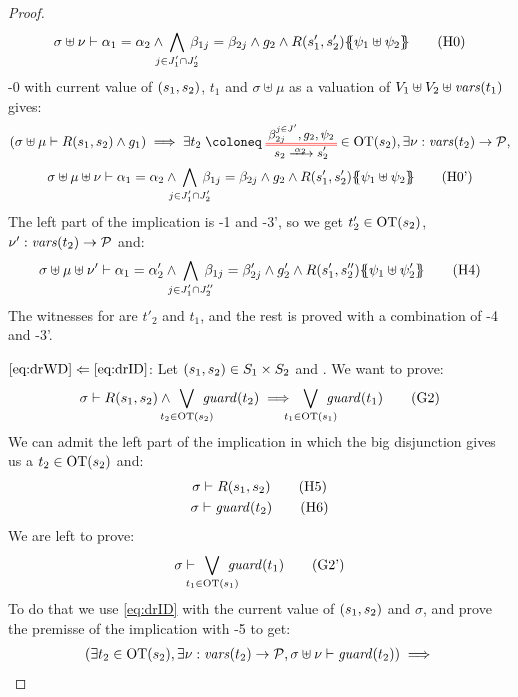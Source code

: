 \documentclass{article}
\begin{document}
\begin{proof}
\begin{multline}
		\sigma \uplus \nu \vdash \alpha_1 = \alpha_2 \wedge \bigwedge_\subbox{j \in J'_1 \cap J'_2} \beta_{1j} = \beta_{2j} \wedge g_2 \wedge R\mpar{s'_1, s'_2}\psubst{\psi_1 \uplus \psi_2} \hyp{0}
	\end{multline}
	\hyp{0} with current value of \({\left(s_1, s_2\right)}\), \(t_1\) and \(\sigma \uplus \mu\) as a valuation of \(V_1 \uplus V_2 \uplus \mathit{vars}{\left(t_1\right)}\) gives:
	\begin{multline}
		\mpar{\sigma \uplus \mu \vdash R\mpar{s_1, s_2} \wedge g_1} \implies \exists t_2 \defobject \OTx{2}{}{2}{} \in \fOT{s_2}, \exists \nu: \fvars{t_2} \to \values, \\
		\sigma \uplus \mu \uplus \nu \vdash \alpha_1 = \alpha_2 \wedge \bigwedge_\subbox{j \in J'_1 \cap J'_2} \beta_{1j} = \beta_{2j} \wedge g_2 \wedge R\mpar{s'_1, s'_2}\psubst{\psi_1 \uplus \psi_2} \hyp{0'}
	\end{multline}
	The left part of the implication is \hyp{1} and \hyp{3'}, so we get \(t'_2 \in \mathrm{OT}{\left(s_2\right)}\), \(\nu': \mathit{vars}{\left(t_2\right)} \to \mathcal{P}\) and:
	\[ \sigma \uplus \mu \uplus \nu' \vdash \alpha_1 = \alpha'_2 \wedge \bigwedge_\subbox{j \in J'_1 \cap J''_2} \beta_{1j} = \beta'_{2j} \wedge g'_2 \wedge R\mpar{s'_1, s''_2}\psubst{\psi_1 \uplus \psi'_2} \hyp{4} \]
	The witnesses for  are \(t'_2\) and \(t_1\), and the rest is proved with a combination of \hyp{4} and \hyp{3'}.
\item[\(\eqref{eq:drWD}\Leftarrow\eqref{eq:drID}\):]
	Let \({\left(s_1, s_2\right)} \in S_1 \times S_2\) and .
	We want to prove:
	\[ \sigma \vdash R\mpar{s_1, s_2} \wedge \bigvee_\subbox{t_2 \in \fOT{s_2}} \fguard{t_2} \implies \bigvee_\subbox{t_1 \in \fOT{s_1}} \fguard{t_1} \goal{2} \]
	We can admit the left part of the implication in which the big disjunction gives us a \(t_2 \in \mathrm{OT}{\left(s_2\right)}\) and:
	\begin{gather}
		\sigma \vdash R\mpar{s_1, s_2} \hyp{5} \\
		\sigma \vdash \fguard{t_2} \hyp{6}
	\end{gather}
	We are left to prove:
	\[ \sigma \vdash \bigvee_\subbox{t_1 \in \fOT{s_1}} \fguard{t_1} \goal{2'} \]
	To do that we use \eqref{eq:drID} with the current value of \({\left(s_1, s_2\right)}\) and \(\sigma\), and prove the premisse of the implication with \hyp{5} to get:
	\begin{multline}
		\mpar{\exists t_2 \in \fOT{s_2}, \exists \nu: \fvars{t_2} \to \values, \sigma \uplus \nu \vdash \fguard{t_2}} \implies \\

\end{multline}
\end{proof}
\end{document}
